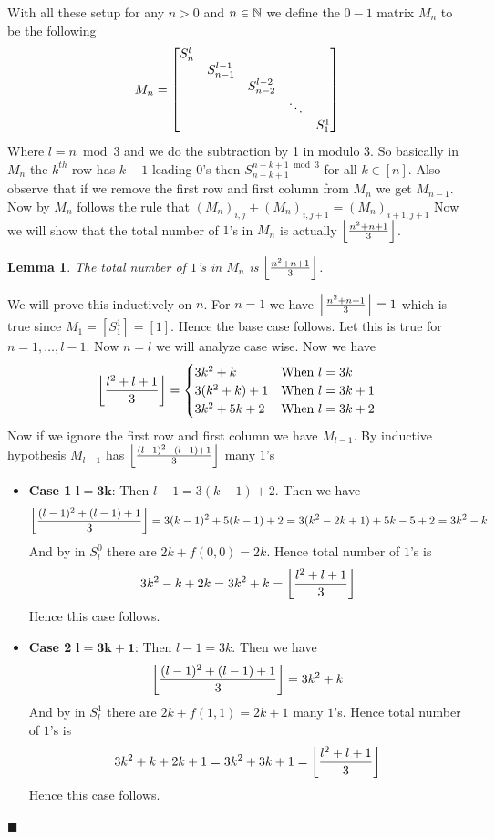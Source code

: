 \documentclass[a4paper, 11pt]{article}
\newtheorem{lemma}{Lemma}
\renewenvironment{proof}{\noindent{\it \textbf{Proof:}}\hspace*{1em}}{\hfill $\blacksquare$\bigskip\\}
\begin{document}
{With all these setup for any $n>0$ and $n\in\mathbb{N}$ we define the $0-1$ matrix $M_n$ to be the following 
$$M_n=\left[\begin{matrix}S_n^{l}\\
&S_{n-1}^{l-1}\\
&& S_{n-2}^{l-2}\\
&&&\ddots \\ &&&&S_1^1 \end{matrix}\right]$$Where $l=n\bmod 3$ and we do the subtraction by 1 in modulo 3. So basically in $M_n$ the $k^{th}$ row  has $k-1$ leading $0$'s then $S_{n-k+1}^{n-k+1\bmod 3}$ for all $k\in[n]$.  Also observe that if we remove the first row and first column from $M_n$ we get $M_{n-1}$. Now by  $M_n$ follows the rule that $(M_n)_{i,j}+(M_n)_{i,j+1}= (M_n)_{i+1,j+1}$ Now we will show that the total number of $1$'s in $M_n$ is actually $\left\lfloor \frac{n^2+n+1}{3}\right\rfloor$. 
\begin{lemma}
	The total number of $1$'s in $M_n$ is $\left\lfloor \frac{n^2+n+1}{3}\right\rfloor$.
\end{lemma}
\begin{proof}
	We will prove this inductively on $n$. For $n=1$ we have $\left\lfloor \frac{n^2+n+1}{3}\right\rfloor=1$ which is true since $M_1=[S_1^1]=[1]$. Hence the base case follows. Let this is true for $n=1,\dots, l-1$. Now $n=l$ we will analyze case wise. 	Now we have $$\left\lfloor \frac{l^2+l+1}{3}\right\rfloor =\begin{cases}
		3k^2+k& \text{When $l=3k$}\\ 3(k^2+k)+1 & \text{When $l=3k+1$}\\ 3k^2+5k+2 & \text{When $l=3k+2$}
	\end{cases}$$Now if we ignore the first row and first column we have $M_{l-1}$. By inductive hypothesis $M_{l-1}$ has $\left\lfloor \frac{(l-1)^2+(l-1)+1}{3}\right\rfloor$ many $1$'s 
	\begin{itemize}[label=$\bullet$]
		\item \textbf{Case 1} $\boldsymbol{l=3k}$: Then $l-1=3(k-1)+2$. Then we have $$\left\lfloor \frac{(l-1)^2+(l-1)+1}{3}\right\rfloor=3(k-1)^2+5(k-1)+2=3(k^2-2k+1)+5k-5+2=3k^2-k$$And by  in $S_l^0$ there are $2k+f(0,0)=2k$. Hence total number of $1$'s is $$3k^2-k+2k=3k^2+k=\left\lfloor \frac{l^2+l+1}{3}\right\rfloor$$Hence this case follows.
		\item \textbf{Case 2} $\boldsymbol{l=3k+1}$: Then $l-1=3k$. Then we have $$\left\lfloor \frac{(l-1)^2+(l-1)+1}{3}\right\rfloor=3k^2+k$$And by  in $S_l^1$ there are $2k+f(1,1)=2k+1$ many $1$'s. Hence total number of $1$'s is $$3k^2+k+2k+1=3k^2+3k+1=\left\lfloor \frac{l^2+l+1}{3}\right\rfloor$$Hence this case follows.

\end{itemize}
\end{proof}}
\end{document}
